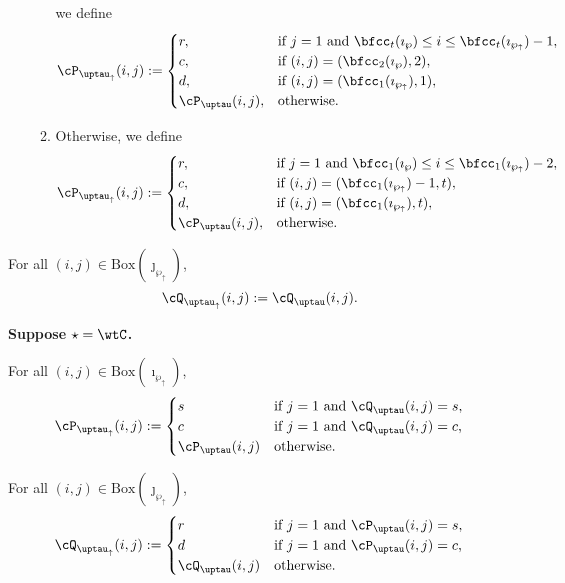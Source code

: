 \documentclass[12pt,a4paper]{amsart}
\numberwithin{equation}{section}
\theoremstyle{remark}
\def\BOX#1{\mathrm{Box}(#1)}
\def\PBPs{\mathsf{PBP}_{\star}}
\def\wpu{\wp_{\uparrow}}
\def\wpd{\wp} %
\def\uptauu{\uptau_{\uparrow}}
\def\uptaud{\uptau} %
\def\PPm{\wp_{\downarrow}}
\def\uptaum{\uptau_{\downarrow}}
\begin{document}
\begin{enumerate}[label=(\alph*)]
\begin{enumerate}[label={\localtextbulletone}]
     we define
     \[
       \cP_{\uptauu}(i,j) := \begin{cases}
         r ,& \text{if $j=1$ and $\bfcc_{t}(\imath_{\wpd})\leq i \leq \bfcc_{t}(\imath_{\wpu})-1$},\\
         c ,& \text{if $(i,j)=(\bfcc_{2}(\imath_{\wpd}),2)$},\\
         d ,& \text{if $(i,j)=(\bfcc_{1}(\imath_{\wpu}),1)$},\\
         \cP_{\uptaud}(i,j) ,&\text{otherwise}.
       \end{cases}
     \]
     \item Otherwise, we define
     \[
       \cP_{\uptauu}(i,j) := \begin{cases}
         r ,& \text{if $j=1$ and $\bfcc_{1}(\imath_{\wpd})\leq i \leq \bfcc_{1}(\imath_{\wpu})-2$},\\
         c ,& \text{if $(i,j)=(\bfcc_{1}(\imath_{\wpu})-1,t)$},\\
         d ,& \text{if $(i,j)=(\bfcc_{1}(\imath_{\wpu}),t)$},\\
         \cP_{\uptaud}(i,j) ,&\text{otherwise}.
       \end{cases}
     \]
   \end{enumerate}
 \end{enumerate}

  For all $(i,j)\in \BOX{\jmath_{\wpu}}$,
   \[
     \cQ_{\uptauu}(i,j) := \cQ_{\uptau}(i,j).
   \]

{\bfseries Suppose $\star = \wtC$.}

  For all $(i,j)\in \BOX{\imath_{\wpu}}$,
  \begin{equation} \label{eq:T.M1}
     \cP_{\uptauu}(i,j) :=
     \begin{cases}
       s& \text{if $j=1$ and  $\cQ_{\uptau}(i,j)=s$,}\\
       c& \text{if $j=1$ and  $\cQ_{\uptau}(i,j)=c$,}\\
       \cP_{\uptau}(i,j) &\text{otherwise.}
     \end{cases}
   \end{equation}

  For all $(i,j)\in \BOX{\jmath_{\wpu}}$,
  \begin{equation} \label{eq:T.M2}
    \cQ_{\uptauu}(i,j) :=
    \begin{cases}
      r& \text{if $j=1$ and  $\cP_{\uptau}(i,j)=s$,}\\
      d& \text{if $j=1$ and  $\cP_{\uptau}(i,j)=c$,}\\
      \cQ_{\uptau}(i,j) &\text{otherwise.}
    \end{cases}
  \end{equation}
\end{document}
